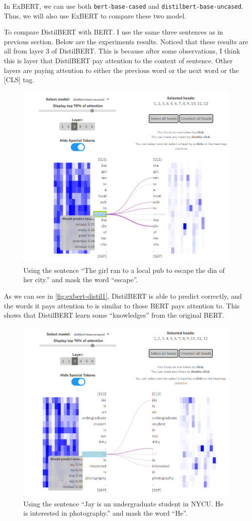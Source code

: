 \documentclass{article}[12pt]
\begin{document}
In ExBERT, we can use both \texttt{bert-base-cased} and \texttt{distilbert-base-uncased}. Thus, we will also use ExBERT to compare these two model.

To compare DistilBERT with BERT. I use the same three sentences as in previous section. Below are the experiments results. Noticed that these results are all from layer 3 of DistilBERT. This is because after some observations, I think this is layer that DistilBERT pay attention to the context of sentence. Other layers are paying attention to either the previous word or the next word or the [CLS] tag.

\begin{figure}[htbp]
	\centering
	\includegraphics[width=0.7\linewidth]{figure/exbert-distil1}
	\caption{Using the sentence ``The girl ran to a local pub to escape the din of her city.'' and mask the word ``escape''.}
	\label{fig:exbert-distil1}
\end{figure}

As we can see in \autoref{fig:exbert-distil1}, DistilBERT is able to predict correctly, and the words it pays attention to is similar to those BERT pays attention to. This shows that DistilBERT learn some ``knowledges'' from the original BERT.

\begin{figure}[htbp]
	\centering
	\includegraphics[width=0.7\linewidth]{figure/exbert-distil2}
	\caption{Using the sentence ``Jay is an undergraduate student in NYCU. He is interested in photography.'' and mask the word ``He''.}
	\label{fig:exbert-distil2}
\end{figure}
\end{document}
